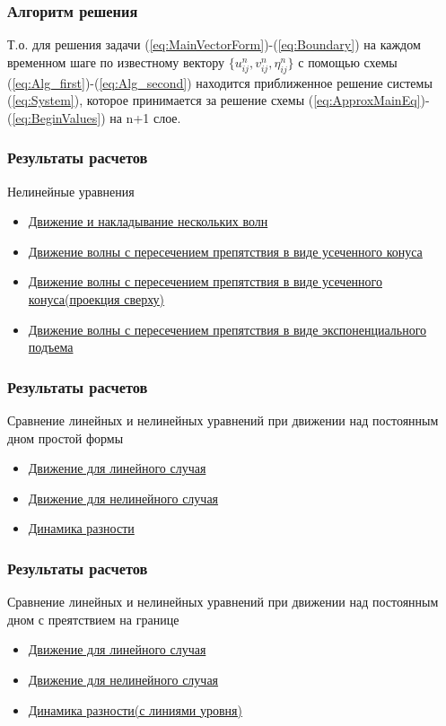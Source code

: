 \documentclass[14pt]{beamer}
\begin{document}
\begin{frame}
\frametitle{Алгоритм решения}
Т.о. для решения задачи (\ref{eq:MainVectorForm})-(\ref{eq:Boundary}) на каждом временном шаге по известному вектору $\{u^n_{ij},v^n_{ij},\eta^n_{ij}\}$ с помощью схемы (\ref{eq:Alg_first})-(\ref{eq:Alg_second}) находится приближенное решение системы (\ref{eq:System}), которое принимается за решение схемы (\ref{eq:ApproxMainEq})-(\ref{eq:BeginValues}) на n+1 слое.
\end{frame}

\begin{frame}
\frametitle{Результаты расчетов}
Нелинейные уравнения
\begin{itemize}
	\item \href{run:video/out_nonlin_gray004.avi}{Движение и накладывание нескольких волн}
	\item \href{run:video/out_model2_standart.avi}{Движение волны с пересечением препятствия в виде усеченного конуса}
	\item \href{run:video/out_model2_map.avi}{Движение волны с пересечением препятствия в виде усеченного конуса(проекция сверху)}
	\item \href{run:video/out_nonlin_exp_buttom.avi}{Движение волны с пересечением препятствия в виде экспоненциального подъема}
\end{itemize}
\end{frame}

\begin{frame}
\frametitle{Результаты расчетов}
Сравнение линейных и нелинейных уравнений при движении над постоянным дном простой формы
\begin{itemize}
	\item \href{run:video/out_lin001.avi}{Движение для линейного случая}
	\item \href{run:video/out_nonlin001.avi}{Движение для нелинейного случая}
	\item \href{run:video/delta001.avi}{Динамика разности}
\end{itemize}
\end{frame}

\begin{frame}
\frametitle{Результаты расчетов}
Сравнение линейных и нелинейных уравнений при движении над постоянным дном с преятствием на границе
\begin{itemize}
	\item \href{run:video/out_lin_100_100.avi}{Движение для линейного случая}
	\item \href{run:video/out_nonlin_100_100.avi}{Движение для нелинейного случая}
	\item \href{run:video/delta_100_100_with_contours.avi}{Динамика разности(с линиями уровня)}
\end{itemize}
\end{frame}
\end{document}
